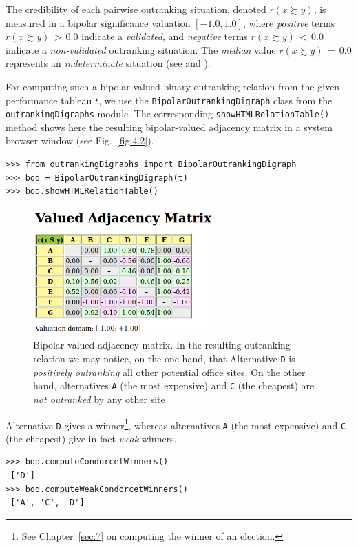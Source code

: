 The credibility of each pairwise outranking situation, denoted $r(x \succsim y)$, is measured in a bipolar significance valuation $[-1.0, 1.0]$, where \emph{positive} terms $r(x \succsim y)\, >\, 0.0$ indicate a \emph{validated}, and \emph{negative} terms $r(x \succsim y)\, <\, 0.0$ indicate a \emph{non-validated} outranking situation. The \emph{median} value $r(x \succsim y)\, = \,0.0$ represents an \emph{indeterminate} situation (see \citet{BIS-2004a} and \citet{BIS-2013}).   

For computing such a bipolar-valued binary outranking relation from the given performance tableau $t$, we use the \texttt{BipolarOutrankingDigraph} class from the \texttt{outrankingDigraphs} module. The corresponding
\texttt{showHTMLRe\-lation\-Table()} method shows here the resulting bipolar-valued adjacency matrix in a system browser window (see Fig.~\vref{fig:4.2}).
\begin{lstlisting}[caption={Computing a bipolar-valued outranking digraph},label=list:4.3]
>>> from outrankingDigraphs import BipolarOutrankingDigraph
>>> bod = BipolarOutrankingDigraph(t)
>>> bod.showHTMLRelationTable()
\end{lstlisting}
\begin{figure}[ht]
\sidecaption[t]
\includegraphics[width=7cm]{Figures/4-2-officeChoiceOutranking.png}
\caption{Bipolar-valued adjacency matrix. In the resulting outranking relation we may notice, on the one hand, that Alternative \texttt{D} is \emph{positively outranking} all other potential office sites. On the other hand, alternatives \texttt{A} (the most expensive) and \texttt{C} (the cheapest) are \emph{not outranked} by any other site}
\label{fig:4.2}       %
\end{figure}

Alternative \texttt{D} gives a \Condorcet winner\footnote{See Chapter~\ref{sec:7} on computing the winner of an election.}, whereas alternatives \texttt{A} (the most expensive) and \texttt{C} (the cheapest) give in fact \emph{weak} \Condorcet winners.
\begin{lstlisting}
>>> bod.computeCondorcetWinners()
 ['D']
>>> bod.computeWeakCondorcetWinners()
 ['A', 'C', 'D']
\end{lstlisting}

